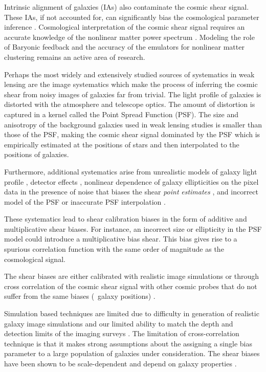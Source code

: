 Intrinsic alignment of galaxies (IAs) also contaminate the cosmic shear signal. These IAs, if not accounted for, 
can significantly bias the cosmological parameter inference \citep{codis2015,joachimi2015, kirk2015,krause_ia}. 
Cosmological interpretation of the cosmic shear signal requires an accurate knowledge of the nonlinear 
matter power spectrum \citep{semboloni2013, eifler2015, schaye2015, joudaki2016, kitching2016, mead2016}. Modeling the role of 
Baryonic feedback and the accuracy of the emulators for nonlinear matter clustering remains an active area of research. 

Perhaps the most widely and extensively studied sources of systematics in weak lensing are the image systematics which make 
the process of inferring the cosmic shear from noisy images of galaxies far from trivial. The light profile of 
galaxies is distorted with the atmosphere and telescope optics. The amount of distortion is captured in a kernel called 
the Point Spread Function (PSF). The size and anisotropy of the background galaxies used in weak lensing studies is 
smaller than those of the PSF, making the cosmic shear signal dominated by the PSF which is empirically estimated at 
the positions of stars and then interpolated to the positions of galaxies.  

Furthermore, additional systematics arise from unrealistic models of galaxy light profile \citep{voight2010,im3shape,kac2014}, 
detector effects \citep{arun2016,jaya2016,plazas2016}, nonlinear dependence of galaxy ellipticities 
on the pixel data in the presence of noise that biases the shear \emph{point} \emph{estimates} \citep{melchoir,great3,conti2017}, 
and incorrect model of the PSF or inaccurate PSF interpolation \citep{rowe2010,kuijken2015,great3,des}.

These systematics lead to shear calibration biases in the form of additive and multiplicative 
shear biases. For instance, an incorrect size or ellipticity in the PSF model could introduce 
a multiplicative bias shear. This bias gives rise to a spurious correlation function with the 
same order of magnitude as the cosmological signal.

The shear biases are either calibrated with realistic image simulations \citep{im3shape,jee2016,conti2017} or through cross correlation of 
the cosmic shear signal with other cosmic probes that do not suffer from the same biases (\eg\ galaxy positions)
\citep{liu2016,schann,singh2017}. 

Simulation based techniques are limited due to difficulty in 
generation of realistic galaxy image simulations \citep{great3,lanus2017} and our limited ability to match the depth and detection limits of 
the imaging surveys \citep{hoekstra}. The limitation of cross-correlation technique is that it makes strong assumptions about the assigning a 
single bias parameter to a large population of galaxies under consideration. The shear biases have been shown to be scale-dependent \citep{des,jee2016} 
and depend on galaxy properties \citep{im3shape,conti2017}. 

